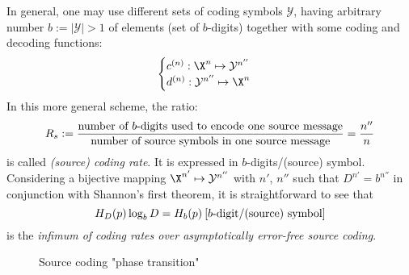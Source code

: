 \documentclass[toc]{../cs-classes/cs-classes}
\begin{document}
\begin{remark}
    In general, one may use different sets of coding symbols $\mathcal{Y}$, having arbitrary number $b:=|\mathcal{Y}|>1$ of elements (set of $b$-digits) together with some coding and decoding functions:
    \begin{equation*}
        \begin{cases}
            c^{(n)}:\X^n\mapsto \mathcal{Y}^{n''}\\
            d^{(n)}:\mathcal{Y}^{n''}\mapsto \X^n
        \end{cases}
    \end{equation*}
    In this more general scheme, the ratio:
    \begin{equation}
        R_s:=\frac{\textnormal{number of $b$-digits used to encode one source message}}{\textnormal{number of source symbols in one source message}} = \frac{n''}{n}
    \end{equation}
    is called \emph{(source) coding rate}. It is expressed in $b$-digits/(source) symbol. Considering a bijective mapping $\X^{n'}\mapsto \mathcal{Y}^{n''}$ with $n'$, $n''$ such that $D^{n'}=b^{n''}$ in conjunction with Shannon's first theorem, it is straightforward to see that
    \begin{equation*}
        H_D(p)\log_bD = H_b(p) \: \textnormal{[$b$-digit/(source) symbol]}
    \end{equation*}
    is the \emph{infimum of coding rates over asymptotically error-free source coding}.
    \begin{figure}[!ht]
        \center
        \caption{Source coding "phase transition"}
    \end{figure}
\end{remark}
\end{document}
